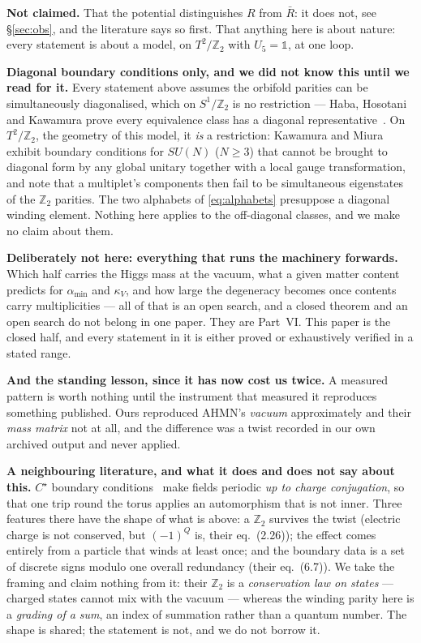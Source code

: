 \documentclass[11pt,a4paper]{article}
\newcommand{\ZZ}{\mathbb{Z}}
\newcommand{\one}{\mathds{1}}
\newcommand{\su}[1]{SU(#1)}
\begin{document}
\textbf{Not claimed.} That the potential distinguishes $R$ from $\bar R$: it does not, see
\S\ref{sec:obs}, and the literature says so first. That anything here is about nature: every
statement is about a model, on $T^2/\ZZ_2$ with $U_5=\one$, at one loop.

\textbf{Diagonal boundary conditions only, and we did not know this until we read for it.} Every
statement above assumes the orbifold parities can be simultaneously diagonalised, which on $S^1/\ZZ_2$
is no restriction --- Haba, Hosotani and Kawamura prove every equivalence class has a diagonal
representative~\cite{HHK}. On $T^2/\ZZ_2$, the geometry of this model, it \emph{is} a restriction:
Kawamura and Miura~\cite{KM} exhibit boundary conditions for $\su N$ ($N\ge3$) that cannot be brought
to diagonal form by any global unitary together with a local gauge transformation, and note that a
multiplet's components then fail to be simultaneous eigenstates of the $\ZZ_2$ parities. The two
alphabets of \eqref{eq:alphabets} presuppose a diagonal winding element. Nothing here applies to the
off-diagonal classes, and we make no claim about them.

\textbf{Deliberately not here: everything that runs the machinery forwards.} Which half carries the
Higgs mass at the vacuum, what a given matter content predicts for $\alpha_{\min}$ and $\kappa_V$,
and how large the degeneracy becomes once contents carry multiplicities --- all of that is an open
search, and a closed theorem and an open search do not belong in one paper. They are Part~VI. This
paper is the closed half, and every statement in it is either proved or exhaustively verified in a
stated range.

\textbf{And the standing lesson, since it has now cost us twice.} A measured pattern is worth
nothing until the instrument that measured it reproduces something published. Ours reproduced
AHMN's \emph{vacuum} approximately and their \emph{mass matrix} not at all, and the difference was a
twist recorded in our own archived output and never applied.

\textbf{A neighbouring literature, and what it does and does not say about this.} $C^\star$ boundary
conditions~\cite{Cstar} make fields periodic \emph{up to charge conjugation}, so that one trip round
the torus applies an automorphism that is not inner. Three features there have the shape of what is
above: a $\ZZ_2$ survives the twist (electric charge is not conserved, but $(-1)^Q$ is, their
eq.~(2.26)); the effect comes entirely from a particle that winds at least once; and the boundary
data is a set of discrete signs modulo one overall redundancy (their eq.~(6.7)). We take the framing
and claim nothing from it: their $\ZZ_2$ is a \emph{conservation law on states} --- charged states
cannot mix with the vacuum --- whereas the winding parity here is a \emph{grading of a sum}, an index
of summation rather than a quantum number. The shape is shared; the statement is not, and we do not
borrow it.
\end{document}
